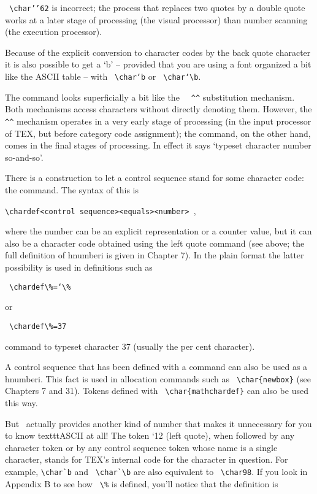 \verb+ \char’’62+  is incorrect; the process that replaces two quotes by a double quote works at a later
stage of processing (the visual processor) than number scanning (the execution processor).

Because of the explicit conversion to character codes by the back quote character it is also possible
to get a ‘b’ – provided that you are using a font organized a bit like the ASCII table – with \verb+ \char‘b+
or \verb+ \char‘\b+.

The  command looks superficially a bit like the \verb+  ^^+ substitution mechanism.
Both mechanisms access characters without directly denoting them. However, the \verb+ ^^+ mechanism
operates in a very early stage of processing (in the input processor of TEX, but before category
code assignment); the  command, on the other hand, comes in the final stages of processing.
In effect it says ‘typeset character number so-and-so’.

There is a construction to let a control sequence stand for some character code: the 
command. The syntax of this is

\verb +\chardef<control sequence><equals><number> +,

where the number can be an explicit representation or a counter value, but it can also be a character
code obtained using the left quote command (see above; the full definition of hnumberi is
given in Chapter 7). In the plain format the latter possibility is used in definitions such as

\verb+ \chardef\%=‘\%+

or 

\verb+ \chardef\%=37   +

command to typeset character 37 (usually the per cent character).

A control sequence that has been defined with a  command can also be used as a hnumberi.
This fact is used in allocation commands such as \verb+ \char{newbox}+ (see Chapters 7 and 31). Tokens defined
with \verb+ \char{mathchardef}+ can also be used this way.


But \tex\ actually provides another kind of number that makes it unnecessary
for you to know texttt{ASCII} at all! The token `12 (left quote), when followed by
any character token or by any control sequence token whose name is a single character,
stands for TEX's internal code for the character in question. For example, \verb+\char`b+ and
\verb+ \char`\b+ are also equivalent to \verb+ \char98+. If you look in Appendix B to see how \verb+ \%+ is
defined, you'll notice that the definition is

